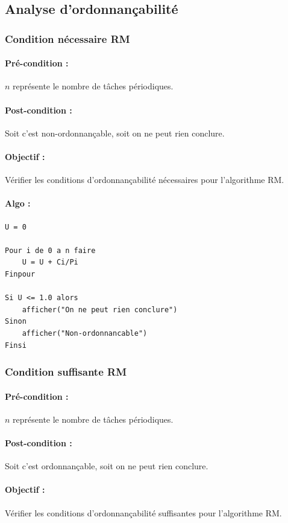 		
		\subsection{Analyse d'ordonnançabilité}
			
			\subsubsection{Condition nécessaire RM}
				\paragraph{Pré-condition :} $n$ représente le nombre de tâches périodiques.
				\paragraph{Post-condition :} Soit c'est non-ordonnançable, soit on ne peut rien conclure.
				\paragraph{Objectif :} Vérifier les conditions d'ordonnançabilité nécessaires pour l'algorithme RM.
				\paragraph{Algo :} 
					\begin{lstlisting}
U = 0
					
Pour i de 0 a n faire
	U = U + Ci/Pi
Finpour		

Si U <= 1.0 alors
	afficher("On ne peut rien conclure")
Sinon
	afficher("Non-ordonnancable")
Finsi
					\end{lstlisting}
			
			\subsubsection{Condition suffisante RM}
				\paragraph{Pré-condition :} $n$ représente le nombre de tâches périodiques.
				\paragraph{Post-condition :} Soit c'est ordonnançable, soit on ne peut rien conclure.
				\paragraph{Objectif :} Vérifier les conditions d'ordonnançabilité suffisantes pour l'algorithme RM.
